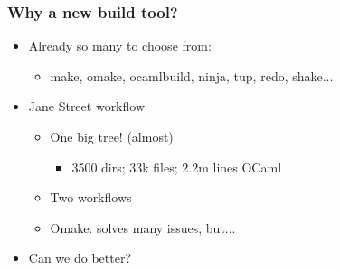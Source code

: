 \documentclass{beamer}
\begin{document}
\begin{frame}[fragile]
\frametitle{Why a new build tool?}
\begin{itemize}
\item Already so many to choose from:
\begin{itemize}
\item make, omake, ocamlbuild, ninja, tup, redo, shake...
\end{itemize}
\item Jane Street workflow
\begin{itemize}
\item One big tree! (almost)
\begin{itemize}
\item 3500 dirs; 33k files; 2.2m lines OCaml
\end{itemize}
\item Two workflows
\item Omake: solves many issues, but...
\end{itemize}
\item Can we do better?
\end{itemize}
\end{frame}

%


% 
%

%
%
% 
\end{document}
